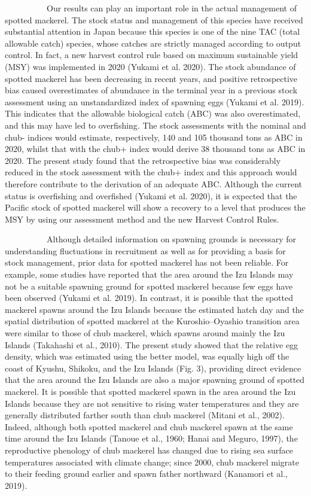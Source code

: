 \documentclass[12pt]{article}
\begin{document}
\begin{linenumbers}
\ \ \ \ \ \ \ \ \ \ 
Our results can play an important role in the actual management of spotted mackerel. The stock status and management of this species have received substantial attention in Japan because this species is one of the nine TAC (total allowable catch) species, whose catches are strictly managed according to output control. In fact, a new harvest control rule based on maximum sustainable yield (MSY) was implemented in 2020 (Yukami et al. 2020). The stock abundance of spotted mackerel has been decreasing in recent years, and positive retrospective bias caused overestimates of abundance in the terminal year in a previous stock assessment using an unstandardized index of spawning eggs (Yukami et al. 2019). This indicates that the allowable biological catch (ABC) was also overestimated, and this may have led to overfishing. 
The stock assessments with the nominal and chub- indices would estimate, respectively, 140 and 105 thousand tons as ABC in 2020, whilst that with the chub+ index would derive 38 thousand tons as ABC in 2020. The present study found that the retrospective bias was considerably reduced in the stock assessment with the chub+ index and this approach would therefore contribute to the derivation of an adequate ABC. Although the current status is overfishing and overfished (Yukami et al. 2020), it is expected that the Pacific stock of spotted mackerel will show a recovery to a level that produces the MSY by using our assessment method and the new Harvest Control Rules.

\ \ \ \ \ \ \ \ \ \ 
Although detailed information on spawning grounds is necessary for understanding fluctuations in recruitment as well as for providing a basis for stock management, prior data for spotted mackerel has not been reliable. For example, some studies have reported that the area around the Izu Islands may not be a suitable spawning ground for spotted mackerel because few eggs have been observed (Yukami et al. 2019). In contrast, it is possible that the spotted mackerel spawns around the Izu Islands because the estimated hatch day and the spatial distribution of spotted mackerel at the Kuroshio--Oyashio transition area were similar to those of chub mackerel, which spawns around mainly the Izu Islands (Takahashi et al., 2010). The present study showed that the relative egg density, which was estimated using the better model, was equally high off the coast of Kyushu, Shikoku, and the Izu Islands (Fig. 3), providing direct evidence that the area around the Izu Islands are also a major spawning ground of spotted mackerel. It is possible that spotted mackerel spawn in the area around the Izu Islands because they are not sensitive to rising water temperatures and they are generally distributed farther south than chub mackerel (Mitani et al., 2002). Indeed, although both spotted mackerel and chub mackerel spawn at the same time around the Izu Islands (Tanoue et al., 1960; Hanai and Meguro, 1997), the reproductive phenology of chub mackerel has changed due to rising sea surface temperatures associated with climate change; since 2000, chub mackerel migrate to their feeding ground earlier and spawn father northward (Kanamori et al., 2019).


\end{linenumbers}
\end{document}
